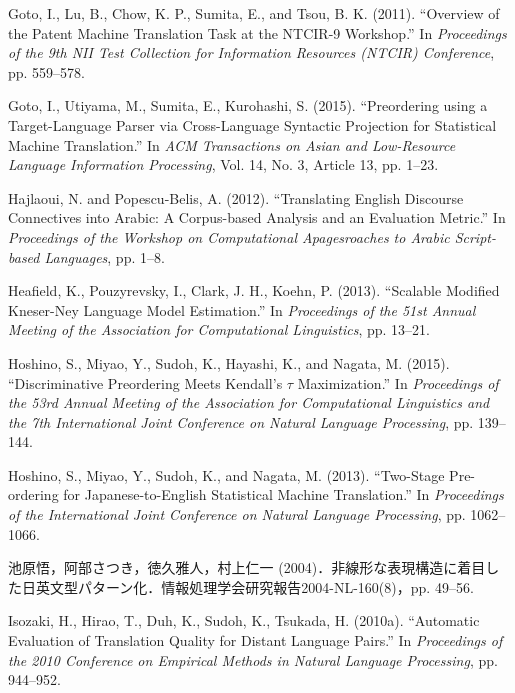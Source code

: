 \documentclass[japanese]{jnlp_1.4}
\begin{document}
\begin{thebibliography}{}
\item
Goto, I., Lu, B., Chow, K. P., Sumita, E., and Tsou, B. K. (2011). ``Overview 
of the Patent Machine Translation Task at the NTCIR-9 Workshop.'' In 
\textit{Proceedings of the 9th NII Test Collection for Information Resources (NTCIR) Conference}, pp. 559--578.

\item
Goto, I., Utiyama, M., Sumita, E., Kurohashi, S. (2015). ``Preordering using 
a Target-Language Parser via Cross-Language Syntactic Projection for 
Statistical Machine Translation.'' In \textit{ACM Transactions on Asian and Low-Resource Language Information Processing}, Vol. 14, No. 3, Article 13, pp. 
1--23.

\item
Hajlaoui, N. and Popescu-Belis, A. (2012). ``Translating English Discourse 
Connectives into Arabic: A Corpus-based Analysis and an Evaluation Metric.'' 
In \textit{Proceedings of the Workshop on Computational Apagesroaches to Arabic Script-based Languages}, pp. 1--8.

\item
Heafield, K., Pouzyrevsky, I., Clark, J. H., Koehn, P. (2013). ``Scalable 
Modified Kneser-Ney Language Model Estimation.'' In \textit{Proceedings of the 51st Annual Meeting of the Association for Computational Linguistics}, pp. 13--21.

\item
Hoshino, S., Miyao, Y., Sudoh, K., Hayashi, K., and Nagata, M. (2015). 
``Discriminative Preordering Meets Kendall's $\tau $ Maximization.'' In 
\textit{Proceedings of the 53rd Annual Meeting of the Association for Computational Linguistics and the 7th International Joint Conference on Natural Language Processing}, pp. 139--144.

\item
Hoshino, S., Miyao, Y., Sudoh, K., and Nagata, M. (2013). ``Two-Stage 
Pre-ordering for Japanese-to-English Statistical Machine Translation.'' In 
\textit{Proceedings of the International Joint Conference on Natural Language Processing}, pp. 1062--1066.

\item
池原悟，阿部さつき，徳久雅人，村上仁一 (2004)．非線形な表現構造に着目した日英文型パターン化．情報処理学会研究報告2004-NL-160(8)，pp. 
49--56.

\item
Isozaki, H., Hirao, T., Duh, K., Sudoh, K., Tsukada, H. (2010a). ``Automatic 
Evaluation of Translation Quality for Distant Language Pairs.'' In 
\textit{Proceedings of the 2010 Conference on Empirical Methods in Natural Language Processing}, pp. 944--952.


\end{thebibliography}
\end{document}
